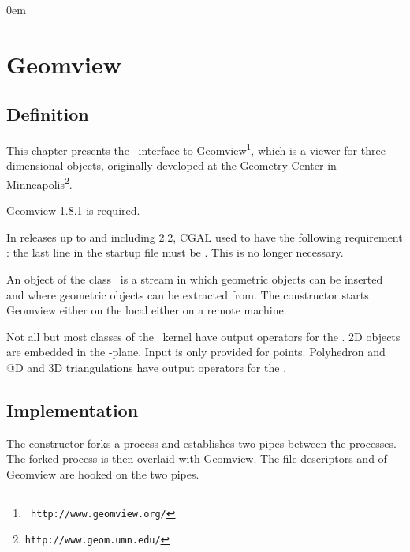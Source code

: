 \newcommand{\Section}[1]{Section~{\protect\ref{#1}}}
\newcommand{\Chapter}[1]{Chapter~{\protect\ref{#1}}}
\newcommand{\new}[1]{\marginpar{\sf #1}}

\newcommand{\what}{\mbox{?\hspace*{2cm}?}}


\parindent0em
\setlength{\parskip}{1ex minus 0.9ex}
\sloppy

\newcommand{\note}[1]{{\bf NOTE: #1}}

\chapter{Geomview} \label{ChapterGeomview}


\section{Definition}

This chapter presents the \cgal\ interface to Geomview\footnote{\tt
http://www.geomview.org/}, which is a
viewer for three-dimensional objects, originally developed at the Geometry
Center in Minneapolis\footnote{\tt http://www.geom.umn.edu/}.

Geomview 1.8.1 is required.

 In releases up to and including 2.2, CGAL used to have
the following requirement : the last line in the startup file 
must be .  This is no longer necessary.


An object of the class \ is a stream in which geometric
objects can be inserted and where geometric objects can be extracted
from. The constructor starts Geomview either on the local either on
a remote machine.



Not all but most classes of the \cgal\ kernel have output
operators for the  . 
2D objects are embedded in the -plane.
Input is only provided for points.
Polyhedron and @D and 3D triangulations  have output
operators for the  . 


\section{Implementation}

The constructor forks a process and establishes two pipes between the
processes. The forked process is then overlaid with Geomview. The
file descriptors  and  of Geomview are hooked
on the two pipes.

